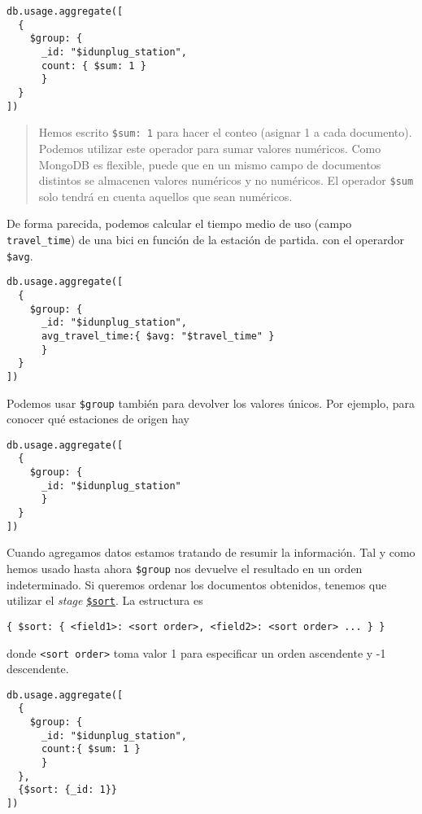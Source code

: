 \documentclass[]{article}
\begin{document}
\begin{verbatim}
db.usage.aggregate([
  {
    $group: {
      _id: "$idunplug_station",
      count: { $sum: 1 }
      }
  }
])
\end{verbatim}

\begin{quote}
Hemos escrito \texttt{\$sum:\ 1} para hacer el conteo (asignar 1 a cada
documento). Podemos utilizar este operador para sumar valores numéricos.
Como MongoDB es flexible, puede que en un mismo campo de documentos
distintos se almacenen valores numéricos y no numéricos. El operador
\texttt{\$sum} solo tendrá en cuenta aquellos que sean numéricos.
\end{quote}

De forma parecida, podemos calcular el tiempo medio de uso (campo
\texttt{travel\_time}) de una bici en función de la estación de partida.
con el operardor \texttt{\$avg}.

\begin{verbatim}
db.usage.aggregate([
  {
    $group: {
      _id: "$idunplug_station",
      avg_travel_time:{ $avg: "$travel_time" }
      }
  }
])
\end{verbatim}

Podemos usar \texttt{\$group} también para devolver los valores únicos.
Por ejemplo, para conocer qué estaciones de origen hay

\begin{verbatim}
db.usage.aggregate([
  {
    $group: {
      _id: "$idunplug_station"
      }
  }
])
\end{verbatim}

Cuando agregamos datos estamos tratando de resumir la información. Tal y
como hemos usado hasta ahora \texttt{\$group} nos devuelve el resultado
en un orden indeterminado. Si queremos ordenar los documentos obtenidos,
tenemos que utilizar el \emph{stage}
\href{https://docs.mongodb.com/manual/reference/operator/aggregation/sort/}{\texttt{\$sort}}.
La estructura es

\begin{verbatim}
{ $sort: { <field1>: <sort order>, <field2>: <sort order> ... } }
\end{verbatim}

donde \texttt{\textless{}sort\ order\textgreater{}} toma valor 1 para
especificar un orden ascendente y -1 descendente.

\begin{verbatim}
db.usage.aggregate([
  {
    $group: {
      _id: "$idunplug_station",
      count:{ $sum: 1 }
      }
  },
  {$sort: {_id: 1}}
])
\end{verbatim}
\end{document}
